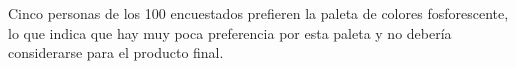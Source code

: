 
Cinco personas de los 100 encuestados prefieren la paleta de colores fosforescente, lo que indica que hay muy poca preferencia por esta paleta y no debería considerarse para el producto final.
